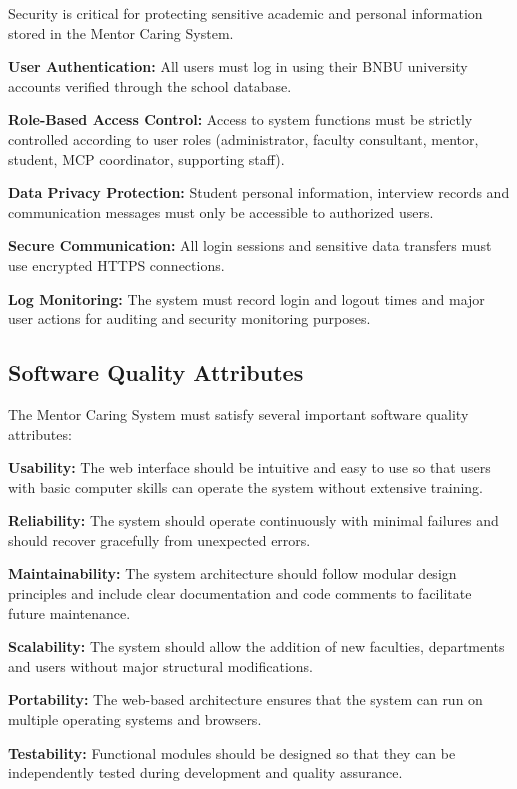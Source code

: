 Security is critical for protecting sensitive academic and personal information stored in the Mentor Caring System.

\textbf{User Authentication:} All users must log in using their BNBU university accounts verified through the school database.

\textbf{Role-Based Access Control:} Access to system functions must be strictly controlled according to user roles (administrator, faculty consultant, mentor, student, MCP coordinator, supporting staff).

\textbf{Data Privacy Protection:} Student personal information, interview records and communication messages must only be accessible to authorized users.

\textbf{Secure Communication:} All login sessions and sensitive data transfers must use encrypted HTTPS connections.

\textbf{Log Monitoring:} The system must record login and logout times and major user actions for auditing and security monitoring purposes.

\subsection{Software Quality Attributes}

The Mentor Caring System must satisfy several important software quality attributes:

\textbf{Usability:} The web interface should be intuitive and easy to use so that users with basic computer skills can operate the system without extensive training.

\textbf{Reliability:} The system should operate continuously with minimal failures and should recover gracefully from unexpected errors.

\textbf{Maintainability:} The system architecture should follow modular design principles and include clear documentation and code comments to facilitate future maintenance.

\textbf{Scalability:} The system should allow the addition of new faculties, departments and users without major structural modifications.

\textbf{Portability:} The web-based architecture ensures that the system can run on multiple operating systems and browsers.

\textbf{Testability:} Functional modules should be designed so that they can be independently tested during development and quality assurance.
